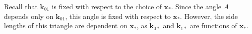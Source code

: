 \documentclass[11pt]{article}
\numberwithin{figure}{section}
\numberwithin{equation}{section}
\def\BayesOpt{\texttt{BayesOpt}}
\newcommand{\bs}[1]{\boldsymbol{#1}}
\def\bsx{\bs{x}}
\def\bsk{\bs{k}}
\def\xast{\bsx_{*}}
\begin{document}
Recall that $\bsk_{01}$ is fixed with respect to the choice of $\xast$. Since the angle $A$ depends only on $\bsk_{01}$, this angle is fixed with respect to $\xast$. However, the side lengths of this triangle are dependent on $\xast$, as $\bsk_{0*}$ and $\bsk_{1*}$ are functions of $\xast$. 
\end{document}
